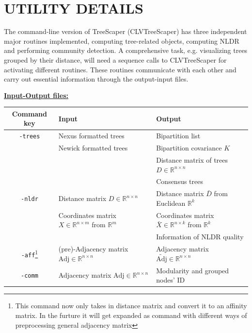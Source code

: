 \documentclass[11pt]{article}
\begin{document}
\newpage
\appendix
\section{UTILITY DETAILS}\label{appendix:UTILITYDETAILS}

The command-line version of TreeScaper (CLVTreeScaper) has three independent major routines implemented, computing tree-related objects, computing NLDR and performing community detection. A comprehensive task, e.g. visualizing trees grouped by their distance, will need a sequence calls to CLVTreeScaper for activating different routines. These routines communicate with each other and carry out essential information through the output-input files.

\noindent \ul{\bf Input-Output files:}
\begin{table}[thbp!]\centering
	\begin{tabular}{|c|l|l|}
		\hline
		Command key & Input& Output \\
		\hline
		{\tt -trees} & Nexus formatted trees & Bipartition list\\
		& Newick formatted trees & Bipartition covariance $K$\\
		& & Distance matrix of trees $D\in \mathbb{R}^{n\times n}$\\
		& & Consensus trees\\
		\hline
		{\tt -nldr} & Distance matrix $D\in \mathbb{R}^{n\times n}$ & Distance matrix $\bar{D}$ from Euclidean $\mathbb{R}^k$\\
		& Coordinates matrix $X\in \mathbb{R}^{n\times m}$ from $\mathbb{R}^m$& Coordinates matrix $\bar{X}\in \mathbb{R}^{n\times k}$ from $\mathbb{R}^k$\\
		&&Information of NLDR quality\\
		\hline
		{\tt -aff}\footnote{This command now only takes in distance matrix and convert it to an affinity matrix. In the furture it will get expanded as command with different ways of preprocessing general adjacency matrix} & (pre)-Adjacency matrix $\text{Adj}\in \mathbb{R}^{n\times n}$ & Adjacency matrix $\widetilde{\text{Adj}}\in \mathbb{R}^{n\times n}$\\
		\hline
		{\tt -comm} & Adjacency matrix $\text{Adj}\in \mathbb{R}^{n\times n}$ & Modularity and grouped nodes' ID\\
		\hline
	\end{tabular}
\end{table}
\end{document}
